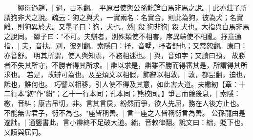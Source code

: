 　　鄒衍過趙，|{
	過，古禾翻。
	}
平原君使與公孫龍論白馬非馬之說。|{
	此亦莊子所謂狗非犬之說。疏云：狗之與犬，一實兩名：名實合，則此為狗，彼為犬；名實離，則狗異於犬。又墨子曰：狗，犬也。然|{
	殺
	}
狗非狗|{
	殺
	}
犬也。大指與白馬非馬之說同。
}
鄒子曰："不可。夫辯者，別殊類使不相害，序異端使不相亂。抒意通指，|{
	夫，音扶。別，彼列翻。索隱曰：抒，音墅，抒者舒也；又常恕翻。康曰：亦音舒。
	}
明其所謂，使人與知焉，不務相迷也。|{
	與，音如字；又讀曰預。
	}
故勝者不失其所守，不勝者得其所求。|{
	辯以求是，辯雖不勝而得審其是，所謂得其所求也。
	}
若是，故辯可為也。及至煩文以相假，飾辭以相敦，|{
	敦，都昆翻，迫也，詆也，誰何也。
	}
巧譬以相移，引人使不得及其意，如此害大道。夫繳紉【章：十二行本"紉"作"紛"；乙十一行本同；孔本同；熊校同。】爭言而競後息，|{
	索隱：繳，音糾；康吉吊切，非。言其言戾，紛然而爭，欲人先屈，務在人後方止也。
	}
不能無害君子，衍不為也。"座皆稱善。|{
	言一座之人皆稱衍言為善。
	}
公孫龍由是遂詘。|{
	通鑒書此，言小辯終不足破大道。絀，音敕律翻。說文曰：絀，貶下也。又讀與屈同。
	}
